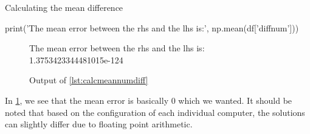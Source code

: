 \begin{listing}[!ht]
    \caption{Calculating the mean difference}
    \label{lst:calcmeannumdiff}
    \begin{pythoncode}
        print('The mean error between the rhs and the lhs is:', np.mean(df['diffnum']))
    \end{pythoncode}
\end{listing}
\begin{figure}[!ht]
    \centering
    \caption{Output of \cref{lst:calcmeannumdiff}}
    \label{fig:calcmeannumdiffout}
    The mean error between the rhs and the lhs is: 1.3753423344481015e-124
\end{figure}

In \cref{fig:calcmeannumdiffout}, we see that the mean error is basically 0 which we wanted.
It should be noted that based on the configuration of each individual computer,
the solutions can slightly differ due to floating point arithmetic.